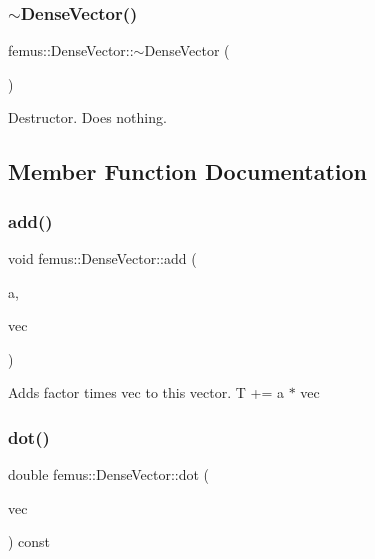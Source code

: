 \subsubsection{\texorpdfstring{$\sim$\+Dense\+Vector()}{~DenseVector()}}
{\footnotesize\ttfamily femus\+::\+Dense\+Vector\+::$\sim$\+Dense\+Vector (\begin{DoxyParamCaption}{ }\end{DoxyParamCaption})\hspace{0.3cm}{\ttfamily [inline]}}



Destructor. Does nothing. 



\subsection{Member Function Documentation}
\mbox{\label{classfemus_1_1_dense_vector_a945b0914e85311e7bcd7c2535818275e}} 
\subsubsection{\texorpdfstring{add()}{add()}}
{\footnotesize\ttfamily void femus\+::\+Dense\+Vector\+::add (\begin{DoxyParamCaption}\item[{const double}]{a,  }\item[{const \mbox{\hyperlink{classfemus_1_1_dense_vector}{Dense\+Vector}} \&}]{vec }\end{DoxyParamCaption})\hspace{0.3cm}{\ttfamily [inline]}}


\begin{DoxyItemize}
\item Adds {\ttfamily factor} times {\ttfamily vec} to this vector. T += a $\ast$ vec 
\end{DoxyItemize}\mbox{\label{classfemus_1_1_dense_vector_a0a9fd31e853459449f244fe6c6ce4e62}} 
\subsubsection{\texorpdfstring{dot()}{dot()}}
{\footnotesize\ttfamily double femus\+::\+Dense\+Vector\+::dot (\begin{DoxyParamCaption}\item[{const \mbox{\hyperlink{classfemus_1_1_dense_vector}{Dense\+Vector}} \&}]{vec }\end{DoxyParamCaption}) const\hspace{0.3cm}{\ttfamily [inline]}}


